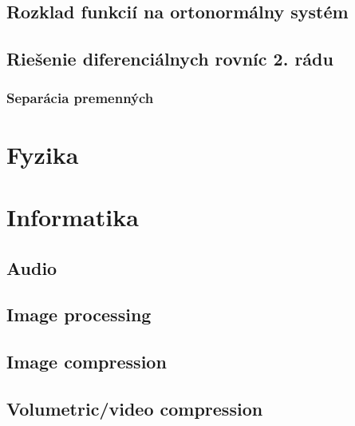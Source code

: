     \subsection{Rozklad funkcií na ortonormálny systém}
    \subsection{Riešenie diferenciálnych rovníc 2. rádu}    
        \subsubsection{Separácia premenných}
    
         
\section{Fyzika}
    
    
    
\section{Informatika}
    
    \subsection{Audio}
    \subsection{Image processing}
    \subsection{Image compression}
    \subsection{Volumetric/video compression}
     

